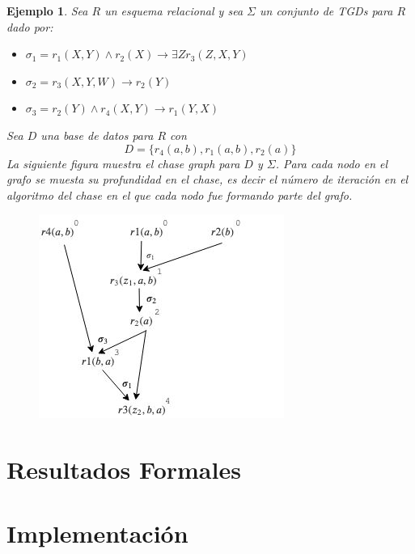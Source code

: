 \documentclass[11pt,a4paper,twoside]{tesis}
\newtheorem{exmp}{Ejemplo}
\begin{document}
\begin{exmp}\label{ejemplo_chase_forest}
    Sea $R$ un esquema relacional y sea $\Sigma$ un conjunto de TGDs para $R$ dado por:
    \begin{itemize}
        \item $\sigma_1 = r_1(X, Y) \land r_2(X) \rightarrow \exists Z r_3(Z, X, Y)$
        \item $\sigma_2 = r_3(X, Y, W) \rightarrow r_2(Y)$
        \item $\sigma_3 = r_2(Y) \land r_4(X, Y) \rightarrow r_1(Y, X)$
    \end{itemize}

Sea $D$ una base de datos para $R$ con $$D=\{r_4(a, b), r_1(a, b), r_2(a)\}$$
La siguiente figura muestra el \textit{chase graph} para $D$ y $\Sigma$. Para cada nodo en el grafo se muesta su profundidad en el chase, es decir el número de iteración en el algoritmo del chase en el que cada nodo fue formando parte del grafo.  
    
\begin{figure}[ht]
    \includegraphics[scale=0.5]{chase_graph}
    \centering
\end{figure}

\end{exmp}


\chapter{Resultados Formales}
\chapter{Implementación}
\end{document}

